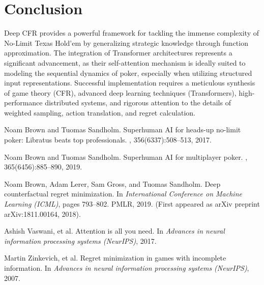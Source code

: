 \documentclass[11pt,a4paper]{article}
\begin{document}
\section{Conclusion}

Deep CFR provides a powerful framework for tackling the immense complexity of No-Limit Texas Hold'em by generalizing strategic knowledge through function approximation. The integration of Transformer architectures represents a significant advancement, as their self-attention mechanism is ideally suited to modeling the sequential dynamics of poker, especially when utilizing structured input representations. Successful implementation requires a meticulous synthesis of game theory (CFR), advanced deep learning techniques (Transformers), high-performance distributed systems, and rigorous attention to the details of weighted sampling, action translation, and regret calculation.


\begin{thebibliography}{1}

Noam Brown and Tuomas Sandholm.
\newblock Superhuman AI for heads-up no-limit poker: Libratus beats top professionals.
, 356(6337):508--513, 2017.

Noam Brown and Tuomas Sandholm.
\newblock Superhuman AI for multiplayer poker.
, 365(6456):885--890, 2019.

Noam Brown, Adam Lerer, Sam Gross, and Tuomas Sandholm.
\newblock Deep counterfactual regret minimization.
\newblock In {\em International Conference on Machine Learning (ICML)}, pages 793--802. PMLR, 2019. (First appeared as arXiv preprint arXiv:1811.00164, 2018).

Ashish Vaswani, et al.
\newblock Attention is all you need.
\newblock In {\em Advances in neural information processing systems (NeurIPS)}, 2017.

Martin Zinkevich, et al.
\newblock Regret minimization in games with incomplete information.
\newblock In {\em Advances in neural information processing systems (NeurIPS)}, 2007.

\end{thebibliography}
\end{document}
